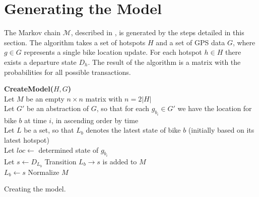 \section{Generating the Model}\label{sec:generatemarkov}
The Markov chain $\mathcal{M}$, described in , is generated by the steps detailed in this section.
The algorithm takes a set of hotspots $H$ and a set of GPS data $G$, where $g \in G$ represents a single bike location update. For each hotspot $h \in H$ there exists a departure state $D_h$.
The result of the algorithm is a matrix with the probabilities for all possible transactions.

\begin{algorithm}[H]
\SetAlgoNoEnd
\textbf{CreateModel($H, G$)} \\
Let $M$ be an empty $n \times n$ matrix with $n = 2|H|$ \\
Let $G'$ be an abstraction of $G$, so that for each $g_{b_i} \in G'$ we have the location for bike $b$ at time $i$, in ascending order by time\\
Let $L$ be a set, so that $L_b$ denotes the latest state of bike $b$ (initially based on its latest hotspot)\\
    {Let $loc \leftarrow $ determined state of $g_{b_i}$\\
      {Let $s \leftarrow D_{L_b}$}
    Transition $L_b \rightarrow s$ is added to $M$\\
     $L_b \leftarrow s$}
Normalize $M$\\
\caption{Creating the model.}
\label{markov:create_model}
\end{algorithm}